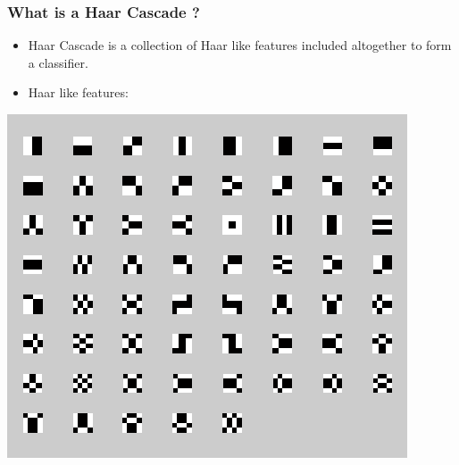 \documentclass[•]{beamer}
\begin{document}
\begin{frame}
\frametitle{What is a \bf Haar Cascade ?}
\begin{itemize}
\item<1->{Haar Cascade is a collection of Haar like features included altogether to form a classifier.}
\item<2->{Haar like features:}
\end{itemize}
\centering\includegraphics[scale=0.4]{features1.png}
\end{frame}
\end{document}
